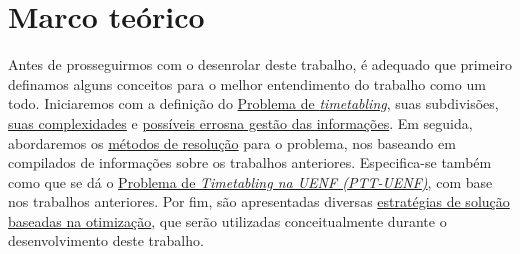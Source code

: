 \chapter{Marco teórico} \label{chap:marco}                                                              %

Antes de prosseguirmos com o desenrolar deste trabalho, é adequado que primeiro definamos alguns conceitos para o melhor entendimento do trabalho como um todo. Iniciaremos com a definição do \hyperref[sec:termos]{Problema de \textit{timetabling}}, suas subdivisões, \hyperref[ssec:desafios]{suas complexidades} e \hyperref[ssec:erros]{possíveis errosna gestão das informações}. Em seguida, abordaremos os \hyperref[sec:resolucao]{métodos de resolução} para o problema, nos baseando em compilados de informações sobre os trabalhos anteriores. Especifica-se também como que se dá o \hyperref[sec:anteriores]{Problema de \textit{Timetabling na UENF (PTT-UENF)}}, com base nos trabalhos anteriores. Por fim, são apresentadas diversas \hyperref[sec:teorias]{estratégias de solução baseadas na otimização}, que serão utilizadas conceitualmente durante o desenvolvimento deste trabalho.




